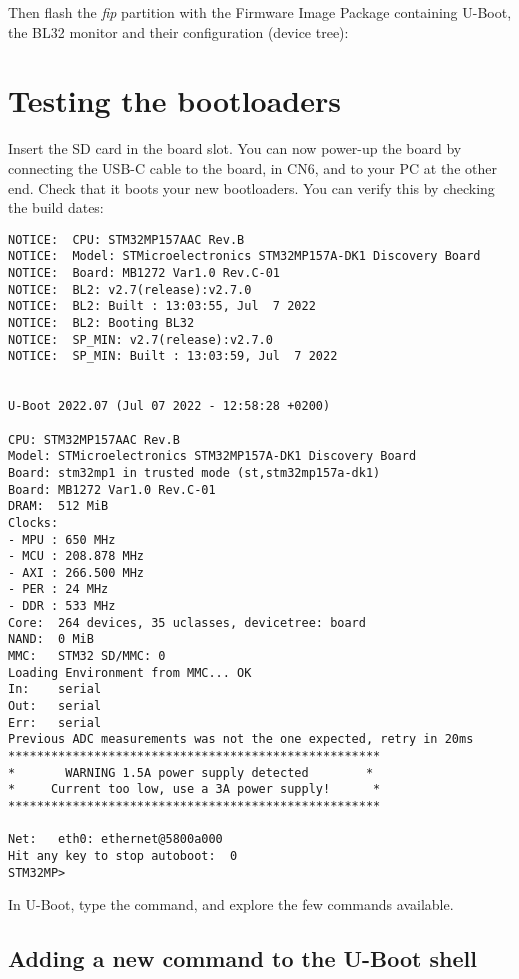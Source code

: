 Then flash the {\em fip} partition with the Firmware Image Package
containing U-Boot, the BL32 monitor and their configuration (device tree):


\section{Testing the bootloaders}

Insert the SD card in the board slot. You can now power-up the board
by connecting the USB-C cable to the board, in CN6,  and
to your PC at the other end. Check that it boots your new bootloaders.
You can verify this by checking the build dates:

\begin{verbatim}
NOTICE:  CPU: STM32MP157AAC Rev.B
NOTICE:  Model: STMicroelectronics STM32MP157A-DK1 Discovery Board
NOTICE:  Board: MB1272 Var1.0 Rev.C-01
NOTICE:  BL2: v2.7(release):v2.7.0
NOTICE:  BL2: Built : 13:03:55, Jul  7 2022
NOTICE:  BL2: Booting BL32
NOTICE:  SP_MIN: v2.7(release):v2.7.0
NOTICE:  SP_MIN: Built : 13:03:59, Jul  7 2022


U-Boot 2022.07 (Jul 07 2022 - 12:58:28 +0200)

CPU: STM32MP157AAC Rev.B
Model: STMicroelectronics STM32MP157A-DK1 Discovery Board
Board: stm32mp1 in trusted mode (st,stm32mp157a-dk1)
Board: MB1272 Var1.0 Rev.C-01
DRAM:  512 MiB
Clocks:
- MPU : 650 MHz
- MCU : 208.878 MHz
- AXI : 266.500 MHz
- PER : 24 MHz
- DDR : 533 MHz
Core:  264 devices, 35 uclasses, devicetree: board
NAND:  0 MiB
MMC:   STM32 SD/MMC: 0
Loading Environment from MMC... OK
In:    serial
Out:   serial
Err:   serial
Previous ADC measurements was not the one expected, retry in 20ms
****************************************************
*       WARNING 1.5A power supply detected        *
*     Current too low, use a 3A power supply!      *
****************************************************

Net:   eth0: ethernet@5800a000
Hit any key to stop autoboot:  0 
STM32MP>
\end{verbatim}

In U-Boot, type the  command, and explore the few commands
available.

\subsection{Adding a new command to the U-Boot shell}

